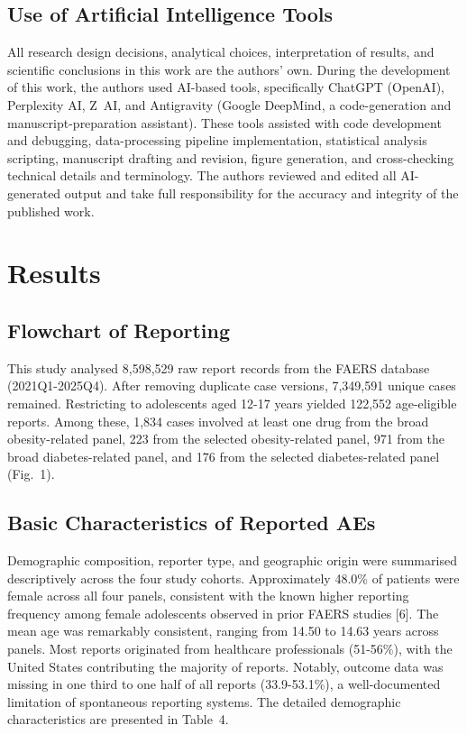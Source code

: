 \documentclass[10pt,a4paper]{article}
\begin{document}
\subsection{Use of Artificial Intelligence Tools}
All research design decisions, analytical choices, interpretation of results, and scientific conclusions in this work are the authors' own. During the development of this work, the authors used AI-based tools, specifically ChatGPT (OpenAI), Perplexity AI, Z~AI, and Antigravity (Google DeepMind, a code-generation and manuscript-preparation assistant). These tools assisted with code development and debugging, data-processing pipeline implementation, statistical analysis scripting, manuscript drafting and revision, figure generation, and cross-checking technical details and terminology. The authors reviewed and edited all AI-generated output and take full responsibility for the accuracy and integrity of the published work.


\section{Results}

\subsection{Flowchart of Reporting}
This study analysed 8,598,529 raw report records from the FAERS database (2021Q1-2025Q4). After removing duplicate case versions, 7,349,591 unique cases remained. Restricting to adolescents aged 12-17 years yielded 122,552 age-eligible reports. Among these, 1,834 cases involved at least one drug from the broad obesity-related panel, 223 from the selected obesity-related panel, 971 from the broad diabetes-related panel, and 176 from the selected diabetes-related panel (Fig.~1).

\subsection{Basic Characteristics of Reported AEs}
Demographic composition, reporter type, and geographic origin were summarised descriptively across the four study cohorts. Approximately 48.0\% of patients were female across all four panels, consistent with the known higher reporting frequency among female adolescents observed in prior FAERS studies [6]. The mean age was remarkably consistent, ranging from 14.50 to 14.63 years across panels. Most reports originated from healthcare professionals (51-56\%), with the United States contributing the majority of reports. Notably, outcome data was missing in one third to one half of all reports (33.9-53.1\%), a well-documented limitation of spontaneous reporting systems. The detailed demographic characteristics are presented in Table~4.
\end{document}
